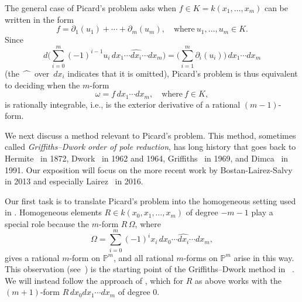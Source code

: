 \documentclass{amsart}
\theoremstyle{definition}
\numberwithin{equation}{section}
\numberwithin{thm}{section}
\begin{document}
The general case of Picard's problem asks when $f \in K = k(x_1, \dots, x_m)$ can be written in the form
\begin{equation}
\label{EQ:genratint}
f = \partial_{1}(u_1) + \cdots + \partial_{m}(u_m),\quad\text{where}\ u_1,\dots,u_m \in K.
\end{equation}
Since
\[
d\Big(\sum_{i=0}^m (-1)^{i-1} u_i \, dx_1 \cdots \widehat{dx_i} \cdots dx_m\Big) = \Big(\sum_{i=1}^m \partial_{i}(u_i)\Big)\,dx_1 \cdots  dx_m
\]
(the $\widehat{\hphantom{dx}}$ over~$dx_i$ indicates that it is omitted),
Picard's problem is thus equivalent to deciding when the $m$-form
\[
\omega = f\, dx_1 \cdots  dx_m, \quad\text{where}\  f \in K,
\]
is rationally integrable, i.e., is the exterior derivative of a rational $(m-1)$-form.

We next discuss a method relevant to Picard's problem.  This method, sometimes called \textit{Griffiths--Dwork order of pole reduction}, has long history that goes back to Hermite~\cite{Hermite1872} in 1872, Dwork~\cite{Dwork1962,Dwork1964} in 1962 and 1964, Griffiths~\cite{Griffiths1969} in 1969, and Dimca~\cite{Dimca1991} in 1991.  Our exposition will focus on the more recent work by Bostan-Lairez-Salvy~\cite{BostanPierreBruno2013} in 2013 and especially Lairez~\cite{Lairez2016} in 2016.  

Our first task is to translate Picard's problem into the homogeneous setting used in 
\cite{BostanPierreBruno2013,Lairez2016}.  Homogeneous elements $R \in k(x_0,x_1,\dots,x_m)$ of degree $-m-1$ play a special role because the $m$-form $R\, \Omega$, where
\[
\Omega = \sum_{i=0}^m (-1)^i x_i\,dx_0 \cdots \widehat{dx_i} \cdots dx_m,
\]
gives a rational $m$-form on $\mathbb{P}^m$, and all rational $m$-forms on $\mathbb{P}^m$ arise in this way.  This observation (see~\cite[Cor.\ 2.11]{Griffiths1969}) is the starting point of the Griffiths--Dwork method in ~\cite{Griffiths1969}.  We will instead follow the approach of \cite{Lairez2016}, which for $R$ as above works with the 
$(m+1)$-form $R\,dx_0dx_1\cdots dx_m$ of degree $0$.
\end{document}
